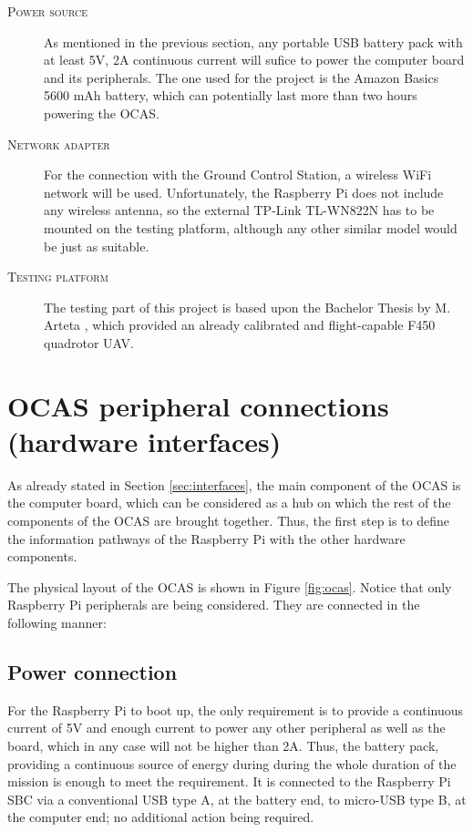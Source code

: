 \begin{description}
	\item[\scshape Power source] As mentioned in the previous section, any portable USB battery pack with at least 5V, 2A continuous current will sufice to power the computer board and its peripherals.
		The one used for the project is the Amazon Basics 5600 mAh battery, which can potentially last more than two hours powering the OCAS.
	\item[\scshape Network adapter] For the connection with the Ground Control Station, a wireless WiFi network will be used.
		Unfortunately, the Raspberry Pi does not include any wireless antenna, so the external TP-Link TL-WN822N has to be mounted on the testing platform, although any other similar model would be just as suitable.
	\item[\scshape Testing platform] The testing part of this project is based upon the Bachelor Thesis by M. Arteta \cite{arteta2015}, which provided an already calibrated and flight-capable F450 quadrotor UAV.
\end{description}




\section{OCAS peripheral connections (hardware interfaces)} \label{sec:peripheral}

As already stated in Section \ref{sec:interfaces}, the main component of the OCAS is the computer board, which can be considered as a hub on which the rest of the components of the OCAS are brought together.
Thus, the first step is to define the information pathways of the Raspberry Pi with the other hardware components.

The physical layout of the OCAS is shown in Figure \ref{fig:ocas}. 
Notice that only Raspberry Pi peripherals are being considered. 
They are connected in the following manner:



\subsection{Power connection}
For the Raspberry Pi to boot up, the only requirement is to provide a continuous current of 5V and enough current to power any other peripheral as well as the board, which in any case will not be higher than 2A.
Thus, the battery pack, providing a continuous source of energy during during the whole duration of the mission is enough to meet the requirement.
It is connected to the Raspberry Pi SBC via a conventional USB type A, at the battery end, to micro-USB type B, at the computer end; no additional action being required.

